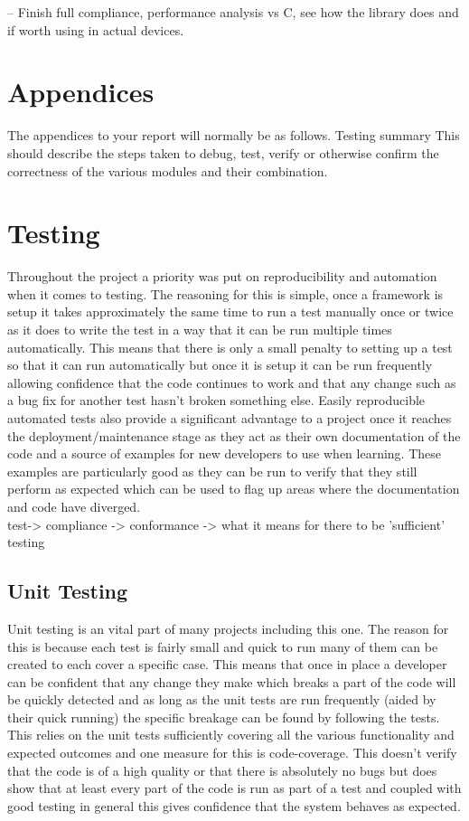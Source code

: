 \documentclass[11pt,a4paper]{report}
\begin{document}
	-- Finish full compliance, performance analysis vs C, see how the library does and if worth using in actual devices. 
	
	\section{Appendices}
	The appendices to your report will normally be as follows.
	Testing
	summary
	This should describe the steps taken to debug, test,
	verify or otherwise confirm the correctness of the
	various modules and their combination.
	
	\section{Testing}
	Throughout the project a priority was put on reproducibility and automation when it comes to testing. The reasoning for this is simple, once a framework is setup it takes approximately the same time to run a test manually once or twice as it does to write the test in a way that it can be run multiple times automatically. This means that there is only a small penalty to setting up a test so that it can run automatically but once it is setup it can be run frequently allowing confidence that the code continues to work and that any change such as a bug fix for another test hasn't broken something else. Easily reproducible automated tests also provide a significant advantage to a project once it reaches the deployment/maintenance stage as they act as their own documentation of the code and a source of examples for new developers to use when learning. These examples are particularly good as they can be run to verify that they still perform as expected which can be used to flag up areas where the documentation and code have diverged.\\
	
		
test-> compliance -> conformance -> what it means for there to be 'sufficient' testing
	
	\subsection{Unit Testing}
	Unit testing is an vital part of many projects including this one. The reason for this is because each test is fairly small and quick to run many of them can be created to each cover a specific case. This means that once in place a developer can be confident that any change they make which breaks a part of the code will be quickly detected and as long as the unit tests are run frequently (aided by their quick running) the specific breakage can be found by following the tests. This relies on the unit tests sufficiently covering all the various functionality and expected outcomes and one measure for this is code-coverage. This doesn't verify that the code is of a high quality or that there is absolutely no bugs but does show that at least every part of the code is run as part of a test and coupled with good testing in general this gives confidence that the system behaves as expected.\\
	
\end{document}
